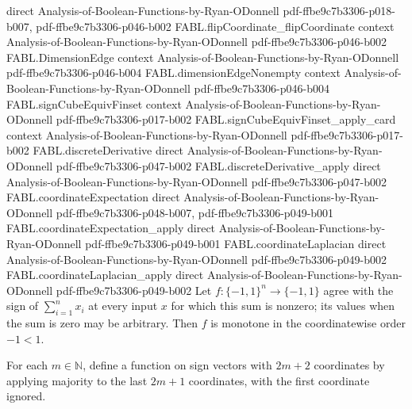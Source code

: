 \begin{theorem}
  {direct}
  {Analysis-of-Boolean-Functions-by-Ryan-ODonnell}
  {pdf-ffbe9c7b3306-p018-b007,
    pdf-ffbe9c7b3306-p046-b002}
\proofstep
  {FABL.flipCoordinate_flipCoordinate}
  {context}
  {Analysis-of-Boolean-Functions-by-Ryan-ODonnell}
  {pdf-ffbe9c7b3306-p046-b002}
\proofstep
  {FABL.DimensionEdge}
  {context}
  {Analysis-of-Boolean-Functions-by-Ryan-ODonnell}
  {pdf-ffbe9c7b3306-p046-b004}
\proofstep
  {FABL.dimensionEdgeNonempty}
  {context}
  {Analysis-of-Boolean-Functions-by-Ryan-ODonnell}
  {pdf-ffbe9c7b3306-p046-b004}
\proofstep
  {FABL.signCubeEquivFinset}
  {context}
  {Analysis-of-Boolean-Functions-by-Ryan-ODonnell}
  {pdf-ffbe9c7b3306-p017-b002}
\proofstep
  {FABL.signCubeEquivFinset_apply_card}
  {context}
  {Analysis-of-Boolean-Functions-by-Ryan-ODonnell}
  {pdf-ffbe9c7b3306-p017-b002}
\proofstep
  {FABL.discreteDerivative}
  {direct}
  {Analysis-of-Boolean-Functions-by-Ryan-ODonnell}
  {pdf-ffbe9c7b3306-p047-b002}
\proofstep
  {FABL.discreteDerivative_apply}
  {direct}
  {Analysis-of-Boolean-Functions-by-Ryan-ODonnell}
  {pdf-ffbe9c7b3306-p047-b002}
\proofstep
  {FABL.coordinateExpectation}
  {direct}
  {Analysis-of-Boolean-Functions-by-Ryan-ODonnell}
  {pdf-ffbe9c7b3306-p048-b007,
    pdf-ffbe9c7b3306-p049-b001}
\proofstep
  {FABL.coordinateExpectation_apply}
  {direct}
  {Analysis-of-Boolean-Functions-by-Ryan-ODonnell}
  {pdf-ffbe9c7b3306-p049-b001}
\proofstep
  {FABL.coordinateLaplacian}
  {direct}
  {Analysis-of-Boolean-Functions-by-Ryan-ODonnell}
  {pdf-ffbe9c7b3306-p049-b002}
\proofstep
  {FABL.coordinateLaplacian_apply}
  {direct}
  {Analysis-of-Boolean-Functions-by-Ryan-ODonnell}
  {pdf-ffbe9c7b3306-p049-b002}
Let $f:\{-1,1\}^n\to\{-1,1\}$ agree with the sign of $\sum_{i=1}^n x_i$ at every
input $x$ for which this sum is nonzero; its values when the sum is zero may be
arbitrary. Then $f$ is monotone in the coordinatewise order $-1<1$.
\end{theorem}

\begin{definition}
\label{FABL.liftedOddMajority}
\leanok
{}
For each $m\in\mathbb N$, define a function on sign vectors with $2m+2$ coordinates by
applying majority to the last $2m+1$ coordinates, with the first coordinate ignored.
\end{definition}


